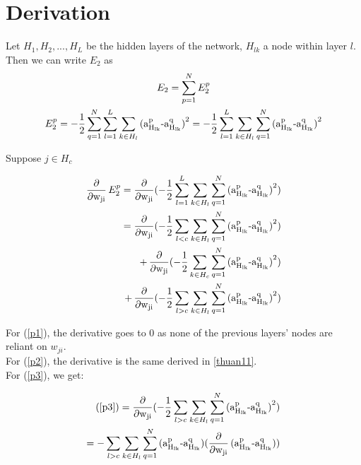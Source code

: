 \section{Derivation}
\label{sec:derivation}

Let $H_1, H_2,...,H_L$ be the hidden layers of the network, $H_{lk}$ a node within layer $l$. Then we can write $E_2$ as 
\begin{gather}
    E_2 = \sum_{p=1}^N E_2^p \\
    E_2^p = -\frac{1}{2}\sum_{q=1}^N\sum_{l=1}^L\sum_{k\in H_{l}} \operatorname{(a_{H_{lk}}^p - a_{H_{lk}}^q)}^2 = -\frac{1}{2}\sum_{l=1}^L\sum_{k\in H_{l}}\sum_{q=1}^N \operatorname{(a_{H_{lk}}^p - a_{H_{lk}}^q)}^2
\end{gather}

Suppose $j\in H_c$

\begin{align}
    \Deriv E_2^p = \Deriv (-\frac{1}{2}\sum_{l=1}^L\sum_{k\in H_{l}}\sum_{q=1}^N \Diff^2) \\
    = \Deriv (-\frac{1}{2}\sum_{l<c}\sum_{k\in H_{l}}\sum_{q=1}^N \Diff^2) \label{p1}\\
    + \Deriv (-\frac{1}{2}\sum_{k\in H_{c}}\sum_{q=1}^N \Diff^2) \label{p2}  \\
    + \Deriv (-\frac{1}{2}\sum_{l>c}\sum_{k\in H_{l}}\sum_{q=1}^N \Diff^2) \label{p3}
\end{align}

For (\ref{p1}), the derivative goes to 0 as none of the previous layers' nodes are reliant on $w_{ji}$. \\
For (\ref{p2}), the derivative is the same derived in \ref{thuan11}. \\
For (\ref{p3}), we get:

\begin{align}
    (\ref{p3}) = \Deriv (-\frac{1}{2}\sum_{l>c}\sum_{k\in H_{l}}\sum_{q=1}^N \Diff^2) \\
    = -\sum_{l>c}\sum_{k\in H_{l}}\sum_{q=1}^N \Diff (\Deriv\Diff) \label{deriv_gen}\\
\end{align}

